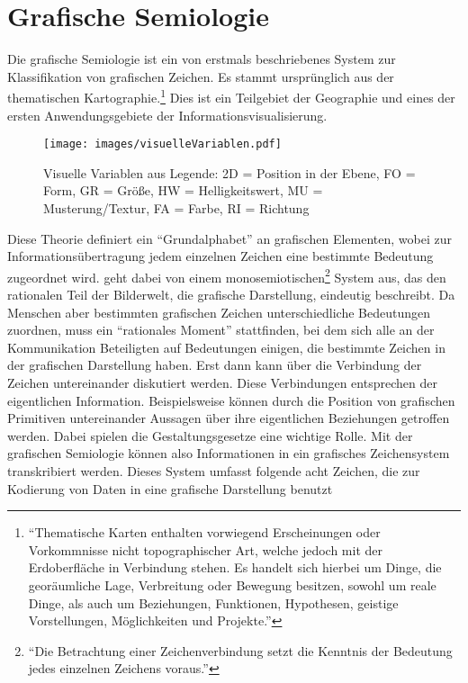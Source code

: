\documentclass[a4paper, 
               12pt,
               DIV=calc,
               version=first,
               pdftex,
               headsepline,
               footsepline,
               bibtotocnumbered,
               liststotocnumbered]{scrreprt}
\begin{document}
\section{Grafische Semiologie}
\label{sec:grafischeSemiologie}
Die grafische Semiologie ist ein von \cite{Bertin} erstmals beschriebenes System zur Klassifikation von grafischen Zeichen.
Es stammt ursprünglich aus der thematischen Kartographie.\footnote{"`Thematische Karten enthalten vorwiegend
Erscheinungen oder Vorkommnisse nicht topographischer Art, welche jedoch mit der Erdoberfläche in Verbindung
stehen. Es handelt sich hierbei um Dinge, die georäumliche Lage, Verbreitung oder Bewegung besitzen, sowohl
um reale Dinge, als auch um Beziehungen, Funktionen, Hypothesen, geistige Vorstellungen, Möglichkeiten und
Projekte."'\citep{Gitta} } Dies ist ein Teilgebiet der Geographie und eines der ersten Anwendungsgebiete der
Informationsvisualisierung.
\begin{figure}
\centering
\texttt{[image: images/visuelleVariablen.pdf]}
\caption{Visuelle Variablen aus \citep[S.\,51]{Bertin} Legende: 2D = Position in der Ebene, FO = Form, GR = Größe,
HW = Helligkeitswert, MU = Musterung/Textur, FA = Farbe, RI = Richtung}
\label{fig:visuelleVariablen}
\end{figure}
Diese Theorie definiert ein "`Grundalphabet"' an grafischen Elementen, wobei zur Informationsübertragung
jedem einzelnen Zeichen eine bestimmte Bedeutung zugeordnet wird. \cite{Bertin} geht dabei von einem
monosemiotischen\footnote{"`Die Betrachtung einer Zeichenverbindung setzt die Kenntnis der Bedeutung jedes
einzelnen Zeichens voraus."'\citep[S.\,3]{Bertin}} System aus, das den rationalen Teil der Bilderwelt, die
grafische Darstellung, eindeutig beschreibt.
Da Menschen aber bestimmten grafischen Zeichen unterschiedliche Bedeutungen zuordnen, muss ein "`rationales Moment"'
stattfinden, bei dem sich alle an der Kommunikation Beteiligten auf Bedeutungen einigen,
die bestimmte Zeichen in der grafischen Darstellung haben. Erst dann kann über die Verbindung der Zeichen untereinander diskutiert
werden. Diese Verbindungen entsprechen der eigentlichen Information. Beispielsweise können
durch die Position von grafischen Primitiven untereinander Aussagen über ihre eigentlichen Beziehungen getroffen werden.
Dabei spielen die Gestaltungsgesetze eine wichtige Rolle.
Mit der grafischen Semiologie können also Informationen in ein grafisches Zeichensystem
transkribiert werden. Dieses System umfasst folgende acht Zeichen, die zur Kodierung von Daten in eine grafische Darstellung benutzt
\end{document}
